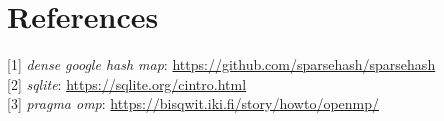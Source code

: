 \section{References}

[1] \textit{dense google hash map}: \href{https://github.com/sparsehash/sparsehash}{https://github.com/sparsehash/sparsehash} \\

[2] \textit{sqlite}: \href{https://sqlite.org/cintro.html}{https://sqlite.org/cintro.html} \\

[3] \textit{pragma omp}: \href{https://bisqwit.iki.fi/story/howto/openmp/}{https://bisqwit.iki.fi/story/howto/openmp/} \\

